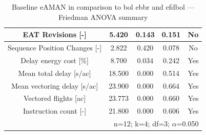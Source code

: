 \begin{table}[htbp]
\caption{Baseline eAMAN in comparison to bol ebbr and efdbol — Friedman ANOVA summary}
\begin{center}
\footnotesize
\setlength{\tabcolsep}{3pt}
\renewcommand{\arraystretch}{1.000}
\begin{tabular}{|c|c|c|c|c|}
\hline
EAT Revisions [-] & 5.420 & 0.143 & 0.151 & No \\
\hline
Sequence Position Changes [-] & 2.822 & 0.420 & 0.078 & No \\
\hline
Delay energy cost [\%] & 8.700 & 0.034 & 0.242 & Yes \\
\hline
Mean total delay [s/ac] & 18.500 & 0.000 & 0.514 & Yes \\
\hline
Mean vectoring delay [s/ac] & 23.900 & 0.000 & 0.664 & Yes \\
\hline
Vectored flights [ac] & 23.773 & 0.000 & 0.660 & Yes \\
\hline
Instruction count [-] & 21.800 & 0.000 & 0.606 & Yes \\
\hline
\multicolumn{5}{r}{n=12; k=4; df=3; $\alpha$=0.050}\\
\end{tabular}
\label{tab:baseline\_eaman\_in\_comparison\_to\_bol\_ebbr\_and\_efdbol\_friedman}
\end{center}
\end{table}